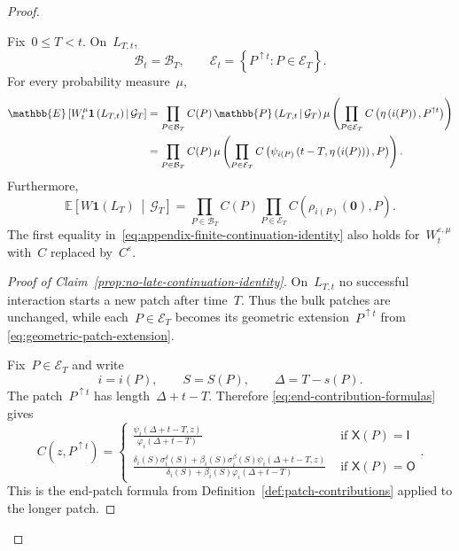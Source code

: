 \documentclass[EJP,preprint,NODS,nobera]{ejpecp}
\newcommand{\pP}{\mathbb{P}}
\newcommand{\E}{\mathbb{E}}
\newcommand{\CE}[2]{\E\Cb{#1\,\middle|\,#2}}
\newcommand{\CP}[2]{\pP\bb{#1\,\middle|\,#2}}
\newcommand{\bb}[1]{\left(#1\right)}
\newcommand{\Cb}[1]{\left[#1\right]}
\newcommand{\cb}[1]{\left\{#1\right\}}
\newcommand{\ind}{\mathbf{1}}
\newcommand{\mb}[1]{\mathbf{#1}}
\newcommand{\pw}[4]{\left\{\begin{array}{cl}
  #1 &\text{ if } #2 \\
  #3 &\text{ if } #4
\end{array}\right.}
\newcommand{\chg}[1]{{\color{changegreen}#1}}
\begin{document}
\begin{proof}
\begin{claim}
\label{prop:no-late-continuation-identity}
Fix~$0\leq T<t$. On~$L_{T,t}$,
\begin{equation*}
\mathcal B_t=\mathcal B_T,
\qquad
\mathcal E_t
=
\cb{P^{\uparrow t}:P\in\mathcal E_T}.
\end{equation*}
For every probability measure~$\mu$,
\begin{align}
\CE{W_t^\mu\ind\bb{L_{T,t}}}{\mathcal G_T}
&=
\prod_{P\in\mathcal B_T}C(P)\,
\CP{L_{T,t}}{\mathcal G_T}
\mu\bb{
 \prod_{P\in\mathcal E_T}
 C\bb{\eta\bb{i(P)},P^{\uparrow t}}
}
\notag
\\
&=
\prod_{P\in\mathcal B_T}C(P)\,
\mu\bb{
 \prod_{P\in\mathcal E_T}
 C\bb{\psi_{i(P)}\bb{t-T,\eta\bb{i(P)}},P}
}.
\label{eq:appendix-finite-continuation-identity}
\end{align}
Furthermore,
\begin{equation}
\label{eq:appendix-infinite-continuation-identity}
\CE{W\ind\bb{L_T}}{\mathcal G_T}
=
\prod_{P\in\mathcal B_T}C(P)
\prod_{P\in\mathcal E_T}
C\bb{\rho_{i(P)}(\mb 0),P}.
\end{equation}
The first equality in~\eqref{eq:appendix-finite-continuation-identity} also
holds for~$W_t^{\varepsilon,\mu}$ with~$C$ replaced by~$C^\varepsilon$.
\end{claim}

\begin{proof}[Proof of Claim~\ref{prop:no-late-continuation-identity}]
On~$L_{T,t}$ no successful interaction starts a new patch after time~$T$.
Thus the bulk patches are unchanged, while each~$P\in\mathcal E_T$ becomes its
geometric extension~$P^{\uparrow t}$ from
\eqref{eq:geometric-patch-extension}.

Fix~$P\in\mathcal E_T$ and write
\begin{equation*}
i=i(P),
\qquad
S=S(P),
\qquad
\Delta=T-s(P).
\end{equation*}
The patch~$P^{\uparrow t}$ has length~$\Delta+t-T$. Therefore
\eqref{eq:end-contribution-formulas} gives
\begin{equation}
\label{eq:end-patch-continuation}
C\bb{z,P^{\uparrow t}}
=
\pw{
\displaystyle
\frac{\psi_i(\Delta+t-T,z)}{\varphi_i(\Delta+t-T)}
}{\mathsf X(P)=\mathsf I}
{
\displaystyle
\frac{
\delta_i(S)\sigma_i^\delta(S)
+
\beta_i(S)\sigma_i^\beta(S)\psi_i(\Delta+t-T,z)
}{
\delta_i(S)+\beta_i(S)\varphi_i(\Delta+t-T)
}
}{\mathsf X(P)=\mathsf O}.
\end{equation}
This is the end-patch formula from \chg{Definition~\ref{def:patch-contributions}} applied to
the longer patch.


\end{proof}
\end{proof}
\end{document}
